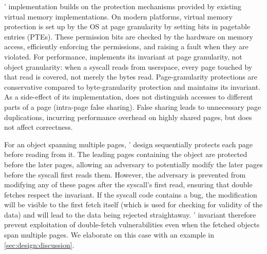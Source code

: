 \documentclass[letterpaper,twocolumn,10pt]{article}
\begin{document}
\midas' implementation builds on the protection mechanisms provided by 
existing virtual memory implementations.
On modern platforms, virtual memory protection is set up by the OS at
page granularity by setting bits in pagetable entries (PTEs).
These permission bits are checked by the hardware on memory access, 
efficiently enforcing the permissions, and raising a fault when they 
are violated.
For performance, \midas implements its invariant at page granularity, not object 
granularity: when a syscall reads from userspace, every page touched by that 
read is covered, not merely the bytes read.
Page-granularity protections are conservative compared to byte-granularity
protection and \midas maintains its invariant.
As a side-effect of its implementation, \midas does not distinguish
accesses to different parts of a page (intra-page false sharing).
False sharing leads to unnecessary page duplications, incurring performance 
overhead on highly shared pages, but does not affect correctness.

For an object spanning multiple pages, \midas' design sequentially 
protects each page before reading from it.
The leading pages containing the object are protected before the
later pages, allowing an adversary to potentially modify the later 
pages before the syscall first reads them.
However, the adversary is prevented from modifying any of these pages
after the syscall's first read, ensuring that double fetches respect
the invariant.
If the syscall code contains a \tocttou bug, the modification will
be visible to the first fetch itself (which is used for checking for 
validity of the data) and will lead to the data being rejected 
straightaway.
\midas' invariant therefore prevent exploitation of double-fetch
vulnerabilities even when the fetched objects span multiple pages.
We elaborate on this case with an example in \autoref{sec:design:discussion}.
\end{document}
